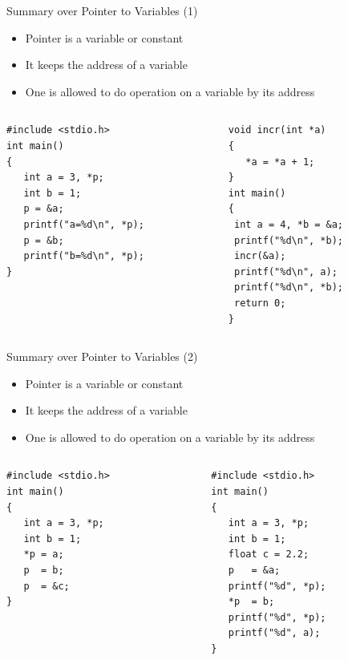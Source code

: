 \begin{frame}[fragile]{Summary over Pointer to Variables (1)}
\vspace{-0.15in}
\begin{itemize}
	\item {Pointer is a variable or constant}
    \item {It keeps the address of a variable}
    \item {One is allowed to do operation on a variable by its address}
\end{itemize}
\begin{columns}
\begin{column}{0.4\linewidth}
\begin{lstlisting}
#include <stdio.h>
int main()
{
   int a = 3, *p;
   int b = 1;
   p = &a;
   printf("a=%d\n", *p);
   p = &b;
   printf("b=%d\n", *p);
}
\end{lstlisting}
\end{column}
\begin{column}{0.45\linewidth}
\begin{lstlisting}
void incr(int *a)
{
   *a = *a + 1;
}
int main()
{
 int a = 4, *b = &a;
 printf("%d\n", *b);
 incr(&a);
 printf("%d\n", a);
 printf("%d\n", *b);
 return 0;
}
\end{lstlisting}
\end{column}
\end{columns}
\end{frame}

\begin{frame}[fragile]{Summary over Pointer to Variables (2)}
\vspace{-0.15in}
\begin{itemize}
	\item {Pointer is a variable or constant}
    \item {It keeps the address of a variable}
    \item {One is allowed to do operation on a variable by its address}
\end{itemize}
\begin{columns}
\begin{column}{0.4\linewidth}
\begin{lstlisting}
#include <stdio.h>
int main()
{
   int a = 3, *p;
   int b = 1;
   *p = a;
   p  = b;
   p  = &c;
}
\end{lstlisting}
\end{column}
\begin{column}{0.45\linewidth}
\begin{lstlisting}
#include <stdio.h>
int main()
{
   int a = 3, *p;
   int b = 1;
   float c = 2.2;
   p   = &a;
   printf("%d", *p);
   *p  = b;
   printf("%d", *p);
   printf("%d", a);
}
\end{lstlisting}
\end{column}
\end{columns}
\end{frame}

